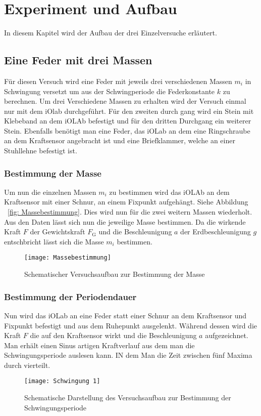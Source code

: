 \section{Experiment und Aufbau}
\label{sec:ExpAufb}
In diesem Kapitel wird der Aufbau der drei Einzelversuche erläutert.
\subsection{Eine Feder mit drei Massen}
Für diesen Versuch wird eine Feder mit jeweils drei verschiedenen Massen $m_i$ in Schwingung versetzt um aus der Schwingperiode die Federkonstante $k$ zu berechnen. Um drei Verschiedene Massen zu erhalten wird der Versuch einmal nur mit dem iOlab durchgeführt. Für den zweiten durch gang wird ein Stein mit Klebeband an dem iOLAb befestigt und für den dritten Durchgang ein weiterer Stein. Ebenfalls benötigt man eine Feder, das iOLab an dem eine Ringschraube an dem Kraftsensor angebracht ist und eine Briefklammer, welche an einer Stuhllehne befestigt ist.
\subsubsection{Bestimmung der Masse}
Um nun die einzelnen Massen $m_i$ zu bestimmen wird das iOLAb an dem Kraftsensor mit einer Schnur, an einem Fixpunkt aufgehängt. Siehe Abbildung ~\ref{fig: Massebestimmung}. Dies wird nun für die zwei weitern Massen wiederholt. Aus den Daten lässt sich nun die jeweilige Masse bestimmen. Da die wirkende Kraft $F$ der Gewichtskraft $F_{\text{G}}$ und die Beschleunigung $a$ der Erdbeschleunigung $g$ entschbricht lässt sich die Masse $m_i$ bestimmen.
\begin{figure}[htb!]
	\label{fig:Massenbestimmung}
	\centering
	\texttt{[image: Massebestimmung]}
	\caption{\label{fig:Massenbestimmung} Schematischer Versuchsaufbau zur Bestimmung der Masse}
\end{figure}
\subsubsection{Bestimmung der Periodendauer}
Nun wird das iOLab an eine Feder statt einer Schnur an dem Kraftsensor und Fixpunkt befestigt und aus dem Ruhepunkt ausgelenkt. Während dessen wird die Kraft $F$ die auf den Kraftsensor wirkt und die Beschleunigung $a$ aufgezeichnet. Man erhält einen Sinus artigen Kraftverlauf aus dem man die Schwingungsperiode auslesen kann. IN dem Man die Zeit zwischen fünf Maxima durch vierteilt.
\begin{figure}[htb!]
	\centering
	\texttt{[image: Schwingung 1]}
	\caption{\label{fig:Schwingungsperiode1}Schematische Darstellung des Versuchsaufbau zur Bestimmung der Schwingungsperiode}
\end{figure}
